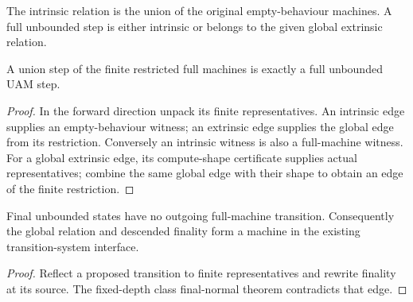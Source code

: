 



\begin{definition}
The intrinsic relation is the union of the original empty-behaviour machines. A full unbounded step is either intrinsic or belongs to the given global extrinsic relation.
\end{definition}




\begin{lemma}
A union step of the finite restricted full machines is exactly a full unbounded UAM step.
\end{lemma}

\begin{proof}
In the forward direction unpack its finite representatives. An intrinsic edge supplies an empty-behaviour witness; an extrinsic edge supplies the global edge from its restriction. Conversely an intrinsic witness is also a full-machine witness. For a global extrinsic edge, its compute-shape certificate supplies actual representatives; combine the same global edge with their shape to obtain an edge of the finite restriction.
\end{proof}



\begin{lemma}
Final unbounded states have no outgoing full-machine transition. Consequently the global relation and descended finality form a machine in the existing transition-system interface.
\end{lemma}

\begin{proof}
Reflect a proposed transition to finite representatives and rewrite finality at its source. The fixed-depth class final-normal theorem contradicts that edge.
\end{proof}


